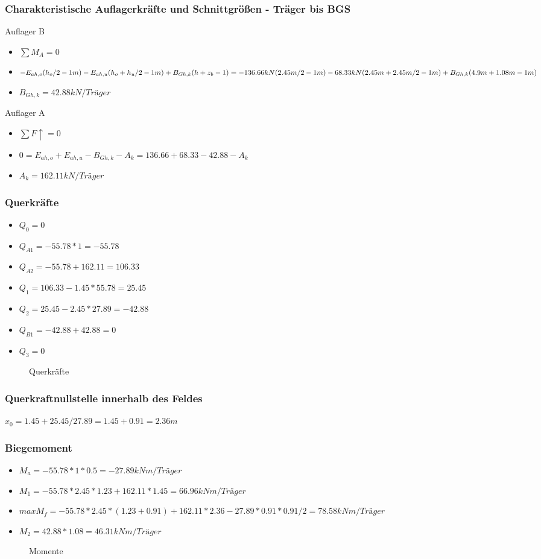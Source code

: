 \documentclass[11pt,fleqn,a4paper,halfparskip]{article}
\begin{document}
\subsubsection{Charakteristische Auflagerkräfte und Schnittgrößen - Träger bis BGS}
Auflager B
\begin{itemize}
\item[] $\sum M_A = 0$
\item[] $ -E_{ah,o} (h_o/2 -1m)-E_{ah,u}(h_o+h_u/2 -1m) + B_{Gh,k} (h + z_b -1) \\ = -136.66kN (2.45m/2-1m) - 68.33kN(2.45m + 2.45m/2 -1m) + B_{Gh,k}(4.9m+1.08m-1m)$
\item[] $B_{Gh,k} = 42.88kN/Träger$
\end{itemize}
Auflager A
\begin{itemize}
\item[] $\sum F\uparrow = 0$
\item[] $ 0 = E_{ah,o}+E_{ah,u} - B_{Gh,k} - A_k = 136.66 + 68.33 - 42.88 - A_k$
\item[] $A_k = 162.11kN/Träger$
\end{itemize}
\subsubsection*{Querkräfte}
\begin{itemize}
\item[] $Q_0 = 0$
\item[] $Q_{A1} = -55.78*1 = -55.78$
\item[] $Q_{A2} = -55.78 + 162.11 = 106.33$
\item[] $Q_1 = 106.33 - 1.45*55.78 = 25.45$
\item[] $Q_2 = 25.45 - 2.45*27.89 = -42.88$
\item[] $Q_{B1} = -42.88 + 42.88 = 0$
\item[] $Q_3 = 0$
\end{itemize}
\begin{figure}[h]
\vspace{8cm}
\caption[Querkraftverlauf 1 Aufgabe 2]{Querkräfte \cite{me}}
\end{figure}
\newpage
\subsubsection*{Querkraftnullstelle innerhalb des Feldes}
$x_0 = 1.45 + 25.45/27.89 = 1.45 + 0.91 = 2.36m$
\subsubsection*{Biegemoment}
\begin{itemize}
\item[] $M_a = -55.78*1*0.5 = -27.89kNm/Träger$
\item[] $M_1 = -55.78*2.45*1.23 + 162.11*1.45 = 66.96kNm/Träger$
\item[] $maxM_f = -55.78 * 2.45 * (1.23 + 0.91) + 162.11*2.36 - 27.89*0.91*0.91/2= 78.58kNm/Träger$
\item[] $M_2 = 42.88*1.08 = 46.31kNm/Träger$
\end{itemize}
\begin{figure}[h]
\vspace{8cm}
\caption[Momentenverlauf 1 Aufgabe 2]{Momente \cite{me}}
\end{figure}
\end{document}

